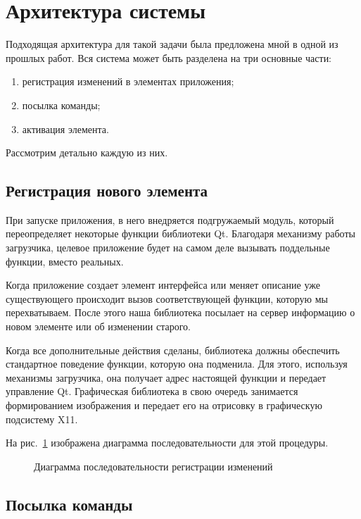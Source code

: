 \section{Архитектура системы}

Подходящая архитектура для такой задачи была предложена мной в одной из прошлых
работ\cite{polshakovinject}. Вся система может быть разделена на три основные 
части:

\begin{enumerate}
    \item регистрация изменений в элементах приложения;
    \item посылка команды;
    \item активация элемента.
\end{enumerate}

Рассмотрим детально каждую из них.

\subsection{Регистрация нового элемента}

При запуске приложения, в него внедряется подгружаемый модуль, который
переопределяет некоторые функции библиотеки Qt. Благодаря механизму работы
загрузчика, целевое приложение будет на самом деле вызывать поддельные
функции, вместо реальных.

Когда приложение создает элемент интерфейса или меняет описание уже
существующего происходит вызов соответствующей функции, которую мы
перехватываем. После этого наша библиотека посылает на сервер информацию
о новом элементе или об изменении старого.

Когда все дополнительные действия сделаны, библиотека должны обеспечить
стандартное поведение функции, которую она подменила. Для этого, используя
механизмы загрузчика, она получает адрес настоящей функции и передает
управление Qt. Графическая библиотека в свою очередь занимается формированием
изображения и передает его на отрисовку в графическую подсистему X11.

На рис.~\ref{fig:create-elem} изображена диаграмма последовательности для
этой процедуры.

\begin{figure}[h]
	\centering
	
	\caption{Диаграмма последовательности регистрации
		изменений}\label{fig:create-elem}
\end{figure}

\subsection{Посылка команды}

